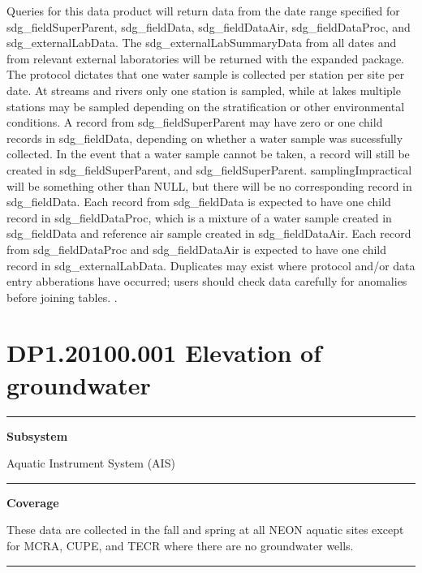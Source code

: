 \documentclass[]{article}
\begin{document}
Queries for this data product will return data from the date range
specified for sdg\_fieldSuperParent, sdg\_fieldData, sdg\_fieldDataAir,
sdg\_fieldDataProc, and sdg\_externalLabData. The
sdg\_externalLabSummaryData from all dates and from relevant external
laboratories will be returned with the expanded package. The protocol
dictates that one water sample is collected per station per site per
date. At streams and rivers only one station is sampled, while at lakes
multiple stations may be sampled depending on the stratification or
other environmental conditions. A record from sdg\_fieldSuperParent may
have zero or one child records in sdg\_fieldData, depending on whether a
water sample was sucessfully collected. In the event that a water sample
cannot be taken, a record will still be created in
sdg\_fieldSuperParent, and sdg\_fieldSuperParent. samplingImpractical
will be something other than NULL, but there will be no corresponding
record in sdg\_fieldData. Each record from sdg\_fieldData is expected to
have one child record in sdg\_fieldDataProc, which is a mixture of a
water sample created in sdg\_fieldData and reference air sample created
in sdg\_fieldDataAir. Each record from sdg\_fieldDataProc and
sdg\_fieldDataAir is expected to have one child record in
sdg\_externalLabData. Duplicates may exist where protocol and/or data
entry abberations have occurred; users should check data carefully for
anomalies before joining tables. \newpage
.

\section{DP1.20100.001 Elevation of
groundwater}\label{dp1.20100.001-elevation-of-groundwater}

\begin{center}\rule{0.5\linewidth}{\linethickness}\end{center}

\textbf{Subsystem}

Aquatic Instrument System (AIS)

\begin{center}\rule{0.5\linewidth}{\linethickness}\end{center}

\textbf{Coverage}

These data are collected in the fall and spring at all NEON aquatic
sites except for MCRA, CUPE, and TECR where there are no groundwater
wells.

\begin{center}\rule{0.5\linewidth}{\linethickness}\end{center}
\end{document}

